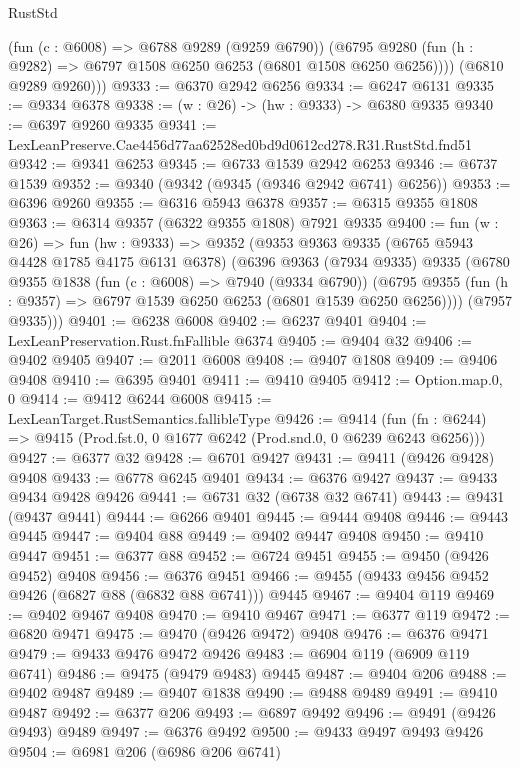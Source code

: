 \begin{lexlean}{RustStd}
\begin{coremodule}
          (fun (c : @6008) => @6788 @9289 (@9259 @6790))
          (@6795 @9280 (fun (h : @9282) => @6797 @1508 @6250 @6253 (@6801 @1508 @6250 @6256))))
        (@6810 @9289 @9260)))
@9333 := @6370 @2942 @6256
@9334 := @6247 @6131
@9335 := @9334 @6378
@9338 := (w : @26) -> (hw : @9333) -> @6380 @9335
@9340 := @6397 @9260 @9335
@9341 := LexLeanPreserve.Cae4456d77aa62528ed0bd9d0612cd278.R31.RustStd.fnd51
@9342 := @9341 @6253
@9345 := @6733 @1539 @2942 @6253
@9346 := @6737 @1539
@9352 := @9340 (@9342 (@9345 (@9346 @2942 @6741) @6256))
@9353 := @6396 @9260
@9355 := @6316 @5943 @6378
@9357 := @6315 @9355 @1808
@9363 := @6314 @9357 (@6322 @9355 @1808) @7921 @9335
@9400 := fun (w : @26) =>
  fun (hw : @9333) =>
  @9352
    (@9353
      @9363
      @9335
      (@6765 @5943 @4428 @1785 @4175 @6131 @6378)
      (@6396
        @9363
        (@7934 @9335)
        @9335
        (@6780
          @9355
          @1838
          (fun (c : @6008) => @7940 (@9334 @6790))
          (@6795 @9355 (fun (h : @9357) => @6797 @1539 @6250 @6253 (@6801 @1539 @6250 @6256))))
        (@7957 @9335)))
@9401 := @6238 @6008
@9402 := @6237 @9401
@9404 := LexLeanPreservation.Rust.fnFallible @6374
@9405 := @9404 @32
@9406 := @9402 @9405
@9407 := @2011 @6008
@9408 := @9407 @1808
@9409 := @9406 @9408
@9410 := @6395 @9401
@9411 := @9410 @9405
@9412 := Option.map.{0, 0}
@9414 := @9412 @6244 @6008
@9415 := LexLeanTarget.RustSemantics.fallibleType
@9426 := @9414
    (fun (fn : @6244) => @9415 (Prod.fst.{0, 0} @1677 @6242 (Prod.snd.{0, 0} @6239 @6243 @6256)))
@9427 := @6377 @32
@9428 := @6701 @9427
@9431 := @9411 (@9426 @9428) @9408
@9433 := @6778 @6245 @9401
@9434 := @6376 @9427
@9437 := @9433 @9434 @9428 @9426
@9441 := @6731 @32 (@6738 @32 @6741)
@9443 := @9431 (@9437 @9441)
@9444 := @6266 @9401
@9445 := @9444 @9408
@9446 := @9443 @9445
@9447 := @9404 @88
@9449 := @9402 @9447 @9408
@9450 := @9410 @9447
@9451 := @6377 @88
@9452 := @6724 @9451
@9455 := @9450 (@9426 @9452) @9408
@9456 := @6376 @9451
@9466 := @9455 (@9433 @9456 @9452 @9426 (@6827 @88 (@6832 @88 @6741))) @9445
@9467 := @9404 @119
@9469 := @9402 @9467 @9408
@9470 := @9410 @9467
@9471 := @6377 @119
@9472 := @6820 @9471
@9475 := @9470 (@9426 @9472) @9408
@9476 := @6376 @9471
@9479 := @9433 @9476 @9472 @9426
@9483 := @6904 @119 (@6909 @119 @6741)
@9486 := @9475 (@9479 @9483) @9445
@9487 := @9404 @206
@9488 := @9402 @9487
@9489 := @9407 @1838
@9490 := @9488 @9489
@9491 := @9410 @9487
@9492 := @6377 @206
@9493 := @6897 @9492
@9496 := @9491 (@9426 @9493) @9489
@9497 := @6376 @9492
@9500 := @9433 @9497 @9493 @9426
@9504 := @6981 @206 (@6986 @206 @6741)

\end{coremodule}
\end{lexlean}
